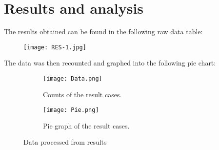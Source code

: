 \section{Results and analysis}
The results obtained can be found in the following raw data table:
\begin{center}\begin{figure}[H]\centering\texttt{[image: RES-1.jpg]}\end{figure}\end{center}
The data was then recounted and graphed into the following pie chart:
\begin{center}\begin{figure}[H]\centering\begin{subfigure}[b]{0.4\linewidth}\texttt{[image: Data.png]}\caption{Counts of the result cases.}\end{subfigure}\begin{subfigure}[b]{0.38\linewidth}\texttt{[image: Pie.png]}\caption{Pie graph of the result cases.}\end{subfigure}\caption{Data processed from results}\end{figure}\end{center}\vspace{-1.5em}
